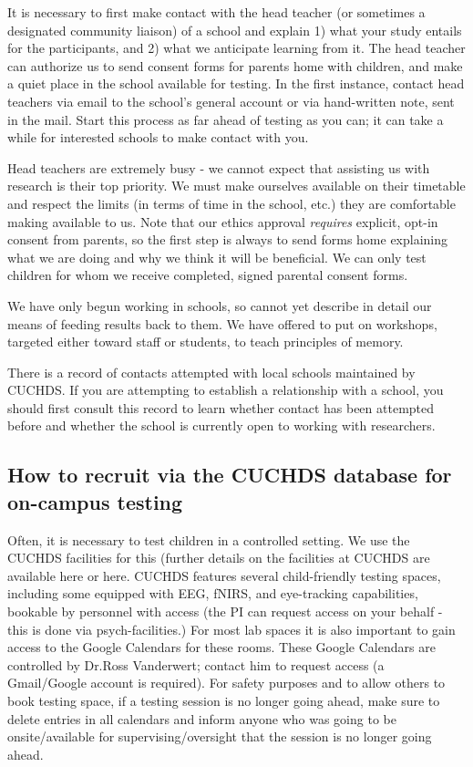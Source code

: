 \documentclass[
  12pt,
]{book}
\begin{document}
It is necessary to first make contact with the head teacher (or sometimes a designated community liaison) of a school and explain 1) what your study entails for the participants, and 2) what we anticipate learning from it. The head teacher can authorize us to send consent forms for parents home with children, and make a quiet place in the school available for testing. In the first instance, contact head teachers via email to the school's general account or via hand-written note, sent in the mail. Start this process as far ahead of testing as you can; it can take a while for interested schools to make contact with you.

Head teachers are extremely busy - we cannot expect that assisting us with research is their top priority. We must make ourselves available on their timetable and respect the limits (in terms of time in the school, etc.) they are comfortable making available to us. Note that our ethics approval \emph{requires} explicit, opt-in consent from parents, so the first step is always to send forms home explaining what we are doing and why we think it will be beneficial. We can only test children for whom we receive completed, signed parental consent forms.

We have only begun working in schools, so cannot yet describe in detail our means of feeding results back to them. We have offered to put on workshops, targeted either toward staff or students, to teach principles of memory.

There is a record of contacts attempted with local schools maintained by CUCHDS. If you are attempting to establish a relationship with a school, you should first consult this record to learn whether contact has been attempted before and whether the school is currently open to working with researchers.

\subsection{How to recruit via the CUCHDS database for on-campus testing}\label{how-to-recruit-via-the-cuchds-database-for-on-campus-testing}

Often, it is necessary to test children in a controlled setting. We use the CUCHDS facilities for this (further details on the facilities at CUCHDS are available here or here. CUCHDS features several child-friendly testing spaces, including some equipped with EEG, fNIRS, and eye-tracking capabilities, bookable by personnel with access (the PI can request access on your behalf - this is done via psych-facilities.) For most lab spaces it is also important to gain access to the Google Calendars for these rooms. These Google Calendars are controlled by Dr.Ross Vanderwert; contact him to request access (a Gmail/Google account is required). For safety purposes and to allow others to book testing space, if a testing session is no longer going ahead, make sure to delete entries in all calendars and inform anyone who was going to be onsite/available for supervising/oversight that the session is no longer going ahead.
\end{document}
